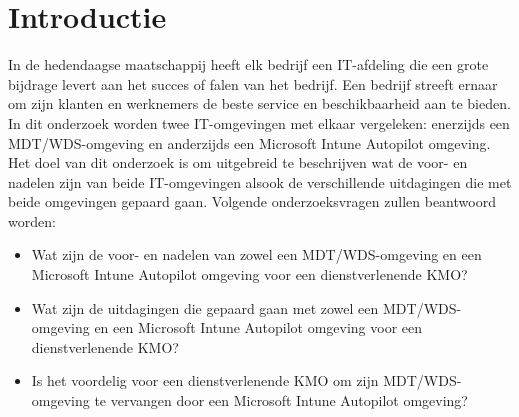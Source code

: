 
\section{Introductie} %
\label{sec:introductie}

In de hedendaagse maatschappij heeft elk bedrijf een IT-afdeling die een grote bijdrage levert aan het succes of falen van het bedrijf. Een bedrijf streeft ernaar om zijn klanten en werknemers de beste service en beschikbaarheid aan te bieden. In dit onderzoek worden twee IT-omgevingen met elkaar vergeleken: enerzijds een MDT/WDS-omgeving en anderzijds een Microsoft Intune Autopilot omgeving. 
\newline
Het doel van dit onderzoek is om uitgebreid te beschrijven wat de voor- en nadelen zijn van beide IT-omgevingen alsook de verschillende uitdagingen die met beide omgevingen gepaard gaan. Volgende onderzoeksvragen zullen beantwoord worden:

\begin{itemize}
    \item Wat zijn de voor- en nadelen van zowel een MDT/WDS-omgeving en een Microsoft Intune Autopilot omgeving voor een dienstverlenende KMO?
    \item Wat zijn de uitdagingen die gepaard gaan met zowel een MDT/WDS-omgeving en een Microsoft Intune Autopilot omgeving voor een dienstverlenende KMO?
    \item Is het voordelig voor een dienstverlenende KMO om zijn MDT/WDS-omgeving te vervangen door een Microsoft Intune Autopilot omgeving?
\end{itemize}






